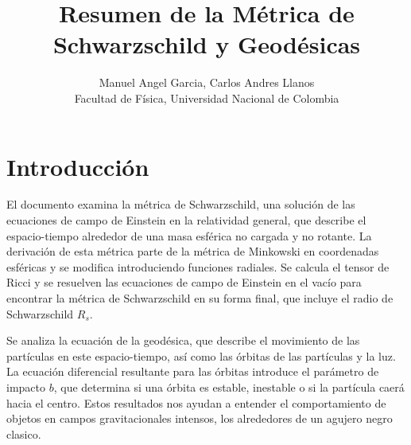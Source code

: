 \documentclass[12pt]{article}
\title{Resumen de la Métrica de Schwarzschild y Geodésicas}
\author{Manuel Angel Garcia, Carlos Andres Llanos \\
Facultad de Física, Universidad Nacional de Colombia}
\date{}
\begin{document}
\maketitle

\section*{Introducción}
El documento examina la métrica de Schwarzschild, una solución de las ecuaciones de campo de Einstein en la relatividad general, que describe el espacio-tiempo alrededor de una masa esférica no cargada y no rotante. La derivación de esta métrica parte de la métrica de Minkowski en coordenadas esféricas y se modifica introduciendo funciones radiales. Se calcula el tensor de Ricci y se resuelven las ecuaciones de campo de Einstein en el vacío para encontrar la métrica de Schwarzschild en su forma final, que incluye el radio de Schwarzschild $R_s$.

Se analiza la ecuación de la geodésica, que describe el movimiento de las partículas en este espacio-tiempo, así como las órbitas de las partículas y la luz. La ecuación diferencial resultante para las órbitas introduce el parámetro de impacto $b$, que determina si una órbita es estable, inestable o si la partícula caerá hacia el centro. Estos resultados nos ayudan a entender el comportamiento de objetos en campos gravitacionales intensos, los alrededores de un agujero negro clasico.
\end{document}
